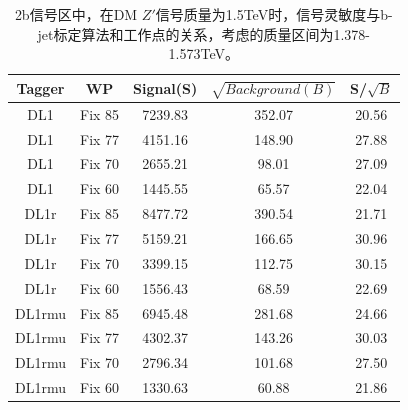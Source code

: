 
\begin{table}[ht]
	\begin{center}
		\begin{tabular}{|c|c|c|c|c|}\hline
			Tagger       & WP          & Signal(S)    & $\sqrt{Background(B)}$    & S/$\sqrt{B}$ \\\hline
			DL1          & Fix 85      & 7239.83      & 352.07        & 20.56        \\
			DL1          & Fix 77      & 4151.16      & 148.90        & 27.88        \\
			DL1          & Fix 70      & 2655.21      & 98.01         & 27.09        \\
			DL1          & Fix 60      & 1445.55      & 65.57         & 22.04        \\
			\hline
			DL1r          & Fix 85      & 8477.72      & 390.54        & 21.71        \\
			DL1r          & Fix 77      & 5159.21      & 166.65        & 30.96        \\
			DL1r          & Fix 70      & 3399.15      & 112.75        & 30.15        \\
			DL1r          & Fix 60      & 1556.43      & 68.59         & 22.69        \\
			\hline
			DL1rmu          & Fix 85      & 6945.48      & 281.68        & 24.66        \\
			DL1rmu          & Fix 77      & 4302.37      & 143.26        & 30.03        \\
			DL1rmu          & Fix 70      & 2796.34      & 101.68        & 27.50        \\
			DL1rmu          & Fix 60      & 1330.63      & 60.88         & 21.86        \\
			\hline
		\end{tabular}
	\end{center}
	\caption{
	2b信号区中，在DM $Z\prime$信号质量为1.5TeV时，信号灵敏度与b-jet标定算法和工作点的关系，考虑的质量区间为1.378-1.573TeV。
	}
	\label{tab:SenZ1p5TeV}
\end{table}%


